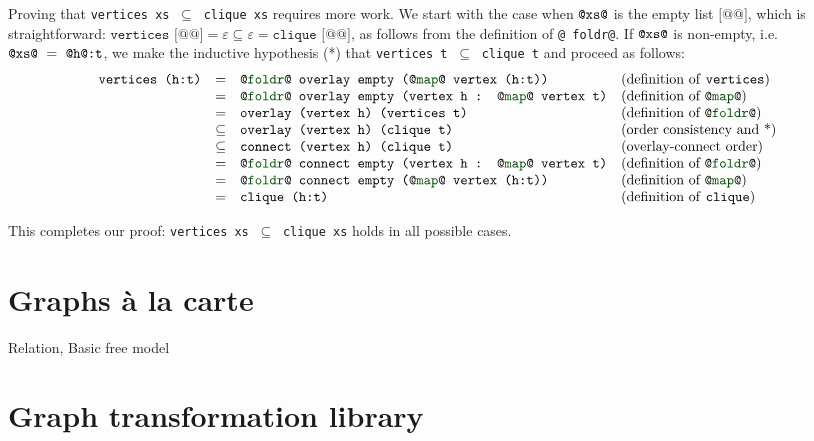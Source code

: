 \documentclass[acmlarge,anonymous]{acmart}\settopmatter{printfolios=true}
\newcommand{\hs}{\texttt}
\newcommand{\std}[1]{{\color[rgb]{0,0.3,0} #1}}
\newcommand{\blk}[1]{{\color[rgb]{0,0,0} #1}}
\begin{document}
Proving that \hs{vertices xs} $\ \subseteq\ $ \hs{clique xs} requires more work.
We start with the case when $\hs{@\blk{xs}@}$ is the empty list $\hs{[@@]}$,
which is straightforward:
$\hs{vertices [@@]} = \varepsilon \subseteq \varepsilon = \hs{clique [@@]}$,
as follows from the definition of \hs{@\std{foldr}@}.
If $\hs{@\blk{xs}@}$ is non-empty, i.e. $\hs{@\blk{xs}@}\ =\ \hs{@\blk{h}@:t}$,
we make the inductive hypothesis (*) that
\hs{vertices t} $\ \subseteq\ $ \hs{clique t} and proceed as follows:
\[
\begin{array}{rcll}
\hs{vertices (h:t)} & = & \hs{@\std{foldr}@ overlay empty (@\std{map}@ vertex (h:t))} & \text{(definition of \hs{vertices})}\\
 & = & \hs{@\std{foldr}@ overlay empty (vertex h : @\std{map}@ vertex t)} & \text{(definition of }\hs{@\std{map}@}\text{)}\\
 & = & \hs{overlay (vertex h) (vertices t)} & \text{(definition of }\hs{@\std{foldr}@}\text{)}\\
 & \subseteq & \hs{overlay (vertex h) (clique t)} & \text{(order consistency and *)}\\
 & \subseteq & \hs{connect (vertex h) (clique t)} & \text{(overlay-connect order)}\\
 & = & \hs{@\std{foldr}@ connect empty (vertex h : @\std{map}@ vertex t)} & \text{(definition of }\hs{@\std{foldr}@}\text{)}\\
 & = & \hs{@\std{foldr}@ connect empty (@\std{map}@ vertex (h:t))} & \text{(definition of }\hs{@\std{map}@}\text{)}\\
 & = & \hs{clique (h:t)} & \text{(definition of \hs{clique})}\\
\end{array}
\]

\noindent
This completes our proof: \hs{vertices xs} $\ \subseteq\ $ \hs{clique xs}
holds in all possible cases.


\section{Graphs \`{a} la carte}\label{sec-a-la-carte}

Relation, Basic
free model


\section{Graph transformation library}\label{sec-transformations}
\end{document}
